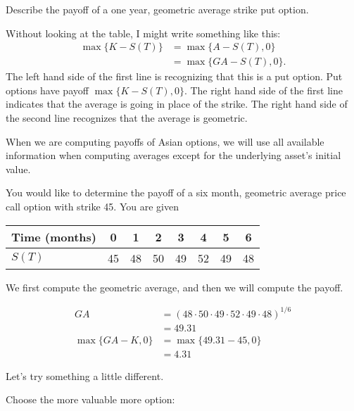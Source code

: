 \documentclass{ximera}
\begin{document}
\begin{example}
Describe the payoff of a one year, geometric average strike put option. 
\end{example}

\begin{solution}
Without looking at the table, I might write something like this:
	\begin{align*}
	\max\{K-S(T)\}	&=\max\{A-S(T),0\}\\
				&=\max\{GA-S(T),0\}.
	\end{align*}
The left hand side of the first line is recognizing that this is a put option. Put options have payoff $\max\{K-S(T),0\}$. The right hand side of the first line indicates that the average is going in place of the strike. The right hand side of the second line recognizes that the average is geometric.
\end{solution}

When we are computing payoffs of Asian options, we will use all available information when computing averages except for the underlying asset's initial value.

\begin{example}
You would like to determine the payoff of a six month, geometric average price call option with strike 45. You are given
	\begin{center}
		\begin{tabular}{lccccccc}
		Time (months)	& 0	& 1	& 2	& 3	& 4	& 5	& 6	\\
		\hline
		$S(T)$		& 45	& 48	& 50	& 49	& 52	& 49	& 48
		\end{tabular}
	\end{center}
\end{example}

\begin{solution}
We first compute the geometric average, and then we will compute the payoff.

	\begin{align*}
	GA			&=(48\cdot 50\cdot 49\cdot 52\cdot 49\cdot 48)^{1/6}\\
				&=49.31\\
	\max\{GA-K,0\}	&=\max\{49.31-45,0\}\\
				&=4.31
	\end{align*}
\end{solution}

Let's try something a little different.

\begin{problem}
Choose the more valuable more option:

	\begin{prompt}
		\begin{multipleChoice}
		\end{multipleChoice}
	\end{prompt}

\end{problem}
\end{document}
